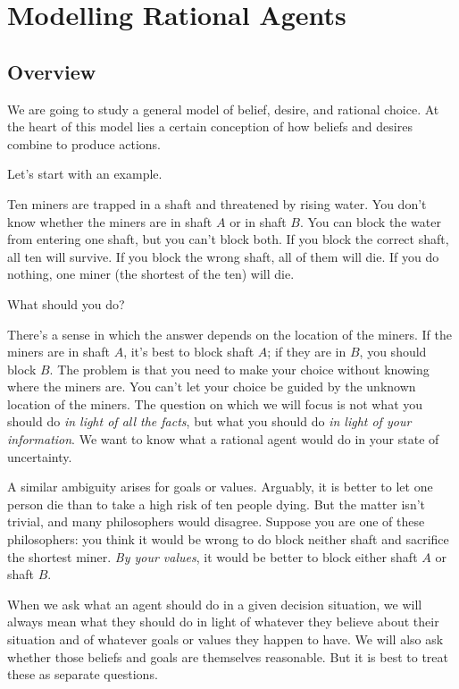 \chapter{Modelling Rational Agents}\label{ch:overview}

\section{Overview}

We are going to study a general model of belief, desire, and rational choice. At
the heart of this model lies a certain conception of how beliefs and desires
combine to produce actions.

Let's start with an example.
%
\begin{example}\label{ex:miners}
  Ten miners are trapped in a shaft and threatened by rising water. You don't
  know whether the miners are in shaft $A$ or in shaft $B$. You can block the
  water from entering one shaft, but you can't block both. If you block the
  correct shaft, all ten will survive. If you block the wrong shaft, all of them
  will die. If you do nothing, one miner (the shortest of the ten) will die.
\end{example}

What should you do?

There's a sense in which the answer depends on the location of the miners. If
the miners are in shaft $A$, it's best to block shaft $A$; if they are in $B$,
you should block $B$. The problem is that you need to make your choice without
knowing where the miners are. You can't let your choice be guided by the unknown
location of the miners. The question on which we will focus is not what you
should do \emph{in light of all the facts}, but what you should do \emph{in
  light of your information}. We want to know what a rational agent would do in
your state of uncertainty.

A similar ambiguity arises for goals or values. Arguably, it is better to let
one person die than to take a high risk of ten people dying. But the matter
isn't trivial, and many philosophers would disagree. Suppose you are one of
these philosophers: you think it would be wrong to do block neither shaft and
sacrifice the shortest miner. \emph{By your values}, it would be better to block
either shaft $A$ or shaft $B$.

When we ask what an agent should do in a given decision situation, we will always
mean what they should do in light of whatever they believe about their situation
and of whatever goals or values they happen to have. We will also ask whether
those beliefs and goals are themselves reasonable. But it is best to treat these
as separate questions.

